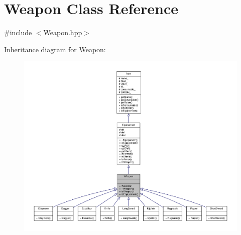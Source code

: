 \hypertarget{class_weapon}{\section{Weapon Class Reference}
\label{class_weapon}
}


{\ttfamily \#include $<$Weapon.\-hpp$>$}



Inheritance diagram for Weapon\-:\nopagebreak
\begin{figure}[H]
\begin{center}
\leavevmode
\includegraphics[width=350pt]{class_weapon__inherit__graph}
\end{center}
\end{figure}


